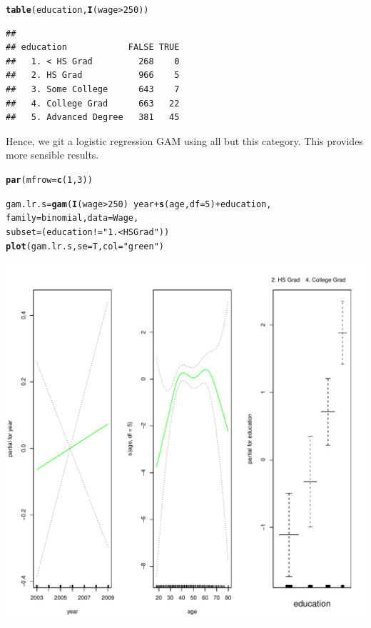 \documentclass[12pt]{article}\usepackage[]{graphicx}\usepackage[]{color}
\makeatletter
\def\maxwidth{ %
  \ifdim\Gin@nat@width>\linewidth
    \linewidth
  \else
    \Gin@nat@width
  \fi
}
\newcommand{\hlnum}[1]{\textcolor[rgb]{0.686,0.059,0.569}{#1}}%
\newcommand{\hlstr}[1]{\textcolor[rgb]{0.192,0.494,0.8}{#1}}%
\newcommand{\hlopt}[1]{\textcolor[rgb]{0,0,0}{#1}}%
\newcommand{\hlstd}[1]{\textcolor[rgb]{0.345,0.345,0.345}{#1}}%
\newcommand{\hlkwb}[1]{\textcolor[rgb]{0.69,0.353,0.396}{#1}}%
\newcommand{\hlkwc}[1]{\textcolor[rgb]{0.333,0.667,0.333}{#1}}%
\newcommand{\hlkwd}[1]{\textcolor[rgb]{0.737,0.353,0.396}{\textbf{#1}}}%
\newenvironment{kframe}{%
 \def\at@end@of@kframe{}%
 \ifinner\ifhmode%
  \def\at@end@of@kframe{\end{minipage}}%
  \begin{minipage}{\columnwidth}%
 \fi\fi%
 \def\FrameCommand##1{\hskip\@totalleftmargin \hskip-\fboxsep
 \colorbox{shadecolor}{##1}\hskip-\fboxsep
     \hskip-\linewidth \hskip-\@totalleftmargin \hskip\columnwidth}%
 \MakeFramed {\advance\hsize-\width
   \@totalleftmargin\z@ \linewidth\hsize
   \@setminipage}}%
 {\par\unskip\endMakeFramed%
 \at@end@of@kframe}
\newenvironment{knitrout}{}{} %
\makeatother
\begin{document}
\begin{knitrout}
\color{fgcolor}\begin{kframe}
\begin{alltt}
\hlkwd{table}\hlstd{(education,} \hlkwd{I}\hlstd{(wage}\hlopt{>}\hlnum{250}\hlstd{))}
\end{alltt}
\begin{verbatim}
##                     
## education            FALSE TRUE
##   1. < HS Grad         268    0
##   2. HS Grad           966    5
##   3. Some College      643    7
##   4. College Grad      663   22
##   5. Advanced Degree   381   45
\end{verbatim}
\end{kframe}
\end{knitrout}

Hence, we git a logistic regression GAM using all but this category. This provides more sensible results.

\begin{knitrout}
\color{fgcolor}\begin{kframe}
\begin{alltt}
\hlkwd{par}\hlstd{(}\hlkwc{mfrow}\hlstd{=}\hlkwd{c}\hlstd{(}\hlnum{1}\hlstd{,}\hlnum{3}\hlstd{))}

\hlstd{gam.lr.s} \hlkwb{=} \hlkwd{gam}\hlstd{(}\hlkwd{I}\hlstd{(wage}\hlopt{>}\hlnum{250}\hlstd{)}\hlopt{~}\hlstd{year}\hlopt{+}\hlkwd{s}\hlstd{(age,} \hlkwc{df}\hlstd{=}\hlnum{5}\hlstd{)}\hlopt{+}\hlstd{education,}
               \hlkwc{family}\hlstd{=binomial,} \hlkwc{data}\hlstd{=Wage,}
               \hlkwc{subset}\hlstd{=(education}\hlopt{!=}\hlstr{"1. < HS Grad"}\hlstd{))}
\hlkwd{plot}\hlstd{(gam.lr.s,} \hlkwc{se}\hlstd{=T,} \hlkwc{col}\hlstd{=}\hlstr{"green"}\hlstd{)}
\end{alltt}
\end{kframe}
\includegraphics[width=\maxwidth]{figure/unnamed-chunk-35-1} 

\end{knitrout}
\end{document}
